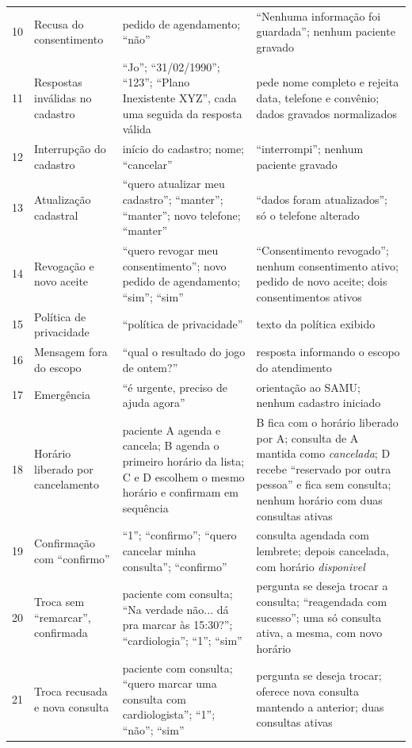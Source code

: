 \documentclass[12pt,a4paper]{extarticle}
\begin{document}
{\begin{xltabular}{\textwidth}{p{0.5cm}L{3cm}YL{4.6cm}}
10 & Recusa do consentimento & pedido de agendamento; ``não'' & ``Nenhuma informação foi guardada''; nenhum paciente gravado \\
11 & Respostas inválidas no cadastro & ``Jo''; ``31/02/1990''; ``123''; ``Plano Inexistente XYZ'', cada uma seguida da resposta válida & pede nome completo e rejeita data, telefone e convênio; dados gravados normalizados \\
12 & Interrupção do cadastro & início do cadastro; nome; ``cancelar'' & ``interrompi''; nenhum paciente gravado \\
13 & Atualização cadastral & ``quero atualizar meu cadastro''; ``manter''; ``manter''; novo telefone; ``manter'' & ``dados foram atualizados''; só o telefone alterado \\
14 & Revogação e novo aceite & ``quero revogar meu consentimento''; novo pedido de agendamento; ``sim''; ``sim'' & ``Consentimento revogado''; nenhum consentimento ativo; pedido de novo aceite; dois consentimentos ativos \\
15 & Política de privacidade & ``política de privacidade'' & texto da política exibido \\
16 & Mensagem fora do escopo & ``qual o resultado do jogo de ontem?'' & resposta informando o escopo do atendimento \\
17 & Emergência & ``é urgente, preciso de ajuda agora'' & orientação ao SAMU; nenhum cadastro iniciado \\
18 & Horário liberado por cancelamento & paciente A agenda e cancela; B agenda o primeiro horário da lista; C e D escolhem o mesmo horário e confirmam em sequência & B fica com o horário liberado por A; consulta de A mantida como \textit{cancelada}; D recebe ``reservado por outra pessoa'' e fica sem consulta; nenhum horário com duas consultas ativas \\
19 & Confirmação com ``confirmo'' & ``1''; ``confirmo''; ``quero cancelar minha consulta''; ``confirmo'' & consulta agendada com lembrete; depois cancelada, com horário \textit{disponivel} \\
20 & Troca sem ``remarcar'', confirmada & paciente com consulta; ``Na verdade não... dá pra marcar às 15:30?''; ``cardiologia''; ``1''; ``sim'' & pergunta se deseja trocar a consulta; ``reagendada com sucesso''; uma só consulta ativa, a mesma, com novo horário \\
21 & Troca recusada e nova consulta & paciente com consulta; ``quero marcar uma consulta com cardiologista''; ``1''; ``não''; ``sim'' & pergunta se deseja trocar; oferece nova consulta mantendo a anterior; duas consultas ativas \\

\end{xltabular}}
\end{document}
